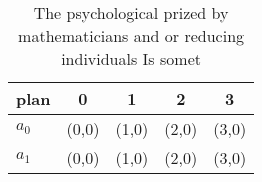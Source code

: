 \documentclass[a4paper]{article}
\begin{document}
\begin{table}
\begin{adjustbox}{width=0.5\columnwidth}
\begin{tabular}{|l|l|l|l|l|}
\hline
\textbf{plan} & \multicolumn{1}{c|}{\textbf{0}} & \multicolumn{1}{c|}{\textbf{1}} & \multicolumn{1}{c|}{\textbf{2}} & \multicolumn{1}{c|}{\textbf{3}} \\ \hline
\textbf{$a_0$}  & (0,0) & (1,0) & (2,0) & (3,0) \\ \hline
\textbf{$a_1$}  & (0,0) & (1,0) & (2,0) & (3,0) \\ \hline
\end{tabular}
\end{adjustbox}
\caption{The psychological prized by mathematicians and or reducing individuals Is somet
}
\end{table}
\end{document}
